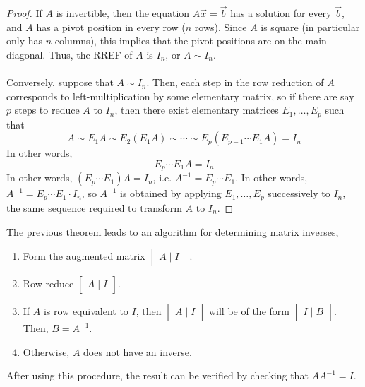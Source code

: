 \documentclass[letterpaper,12pt]{article}
\begin{document}
\begin{proof}
If $A$ is invertible, then the equation $A\vec{x} = \vec{b}$ has a solution for every $\vec{b}$, and $A$ has a pivot position in every row ($n$ rows). Since $A$ is square (in particular only has $n$ columns), this implies that the pivot positions are on the main diagonal. Thus, the RREF of $A$ is $I_n$, or $A \sim I_n$.
\\ \\ Conversely, suppose that $A \sim I_n$. Then, each step in the row reduction of $A$ corresponds to left-multiplication by some elementary matrix, so if there are say $p$ steps to reduce $A$ to $I_n$, then there exist elementary matrices $E_1, \dots, E_p$ such that
\begin{equation*}
    A \sim E_1 A \sim E_2(E_1 A) \sim \cdots \sim E_p(E_{p-1} \cdots E_1 A) = I_n
\end{equation*}
In other words,
\begin{equation*}
    E_p \cdots E_1 A = I_n
\end{equation*}
In other words, $(E_p \cdots E_1) A = I_n$, i.e. $A^{-1} = E_p \cdots E_1$. In other words, $A^{-1} = E_p \cdots E_1 \cdot I_n$, so $A^{-1}$ is obtained by applying $E_1, \dots, E_p$ successively to $I_n$, the same sequence required to transform $A$ to $I_n$.
\end{proof}

The previous theorem leads to an algorithm for determining matrix inverses,

\begin{enumerate}
    \item Form the augmented matrix $\begin{bmatrix} A \mid I \end{bmatrix}$.
    \item Row reduce $\begin{bmatrix} A \mid I \end{bmatrix}$.
    \item If $A$ is row equivalent to $I$, then $\begin{bmatrix} A \mid I \end{bmatrix}$ will be of the form $\begin{bmatrix} I \mid B \end{bmatrix}$. Then, $B = A^{-1}$.
    \item Otherwise, $A$ does not have an inverse.
\end{enumerate}

After using this procedure, the result can be verified by checking that $AA^{-1} = I$.
\end{document}
